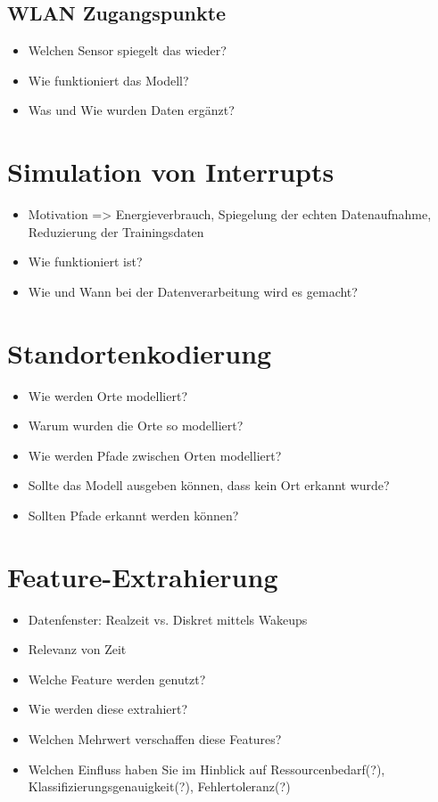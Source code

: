 \subsection{WLAN Zugangspunkte}
\begin{itemize}
    \item Welchen Sensor spiegelt das wieder?
    \item Wie funktioniert das Modell?
    \item Was und Wie wurden Daten ergänzt?
\end{itemize}

\section{Simulation von Interrupts}
\begin{itemize}
    \item Motivation => Energieverbrauch, Spiegelung der echten Datenaufnahme, Reduzierung der Trainingsdaten
    \item Wie funktioniert ist?
    \item Wie und Wann bei der Datenverarbeitung wird es gemacht?
\end{itemize}

\section{Standortenkodierung}
\begin{itemize}
    \item Wie werden Orte modelliert?
    \item Warum wurden die Orte so modelliert?
    \item Wie werden Pfade zwischen Orten modelliert?
    \item Sollte das Modell ausgeben können, dass kein Ort erkannt wurde?
    \item Sollten Pfade erkannt werden können?
\end{itemize}

\section{Feature-Extrahierung}
\begin{itemize}
    \item Datenfenster: Realzeit vs. Diskret mittels Wakeups
    \item Relevanz von Zeit
    \item Welche Feature werden genutzt?
    \item Wie werden diese extrahiert?
    \item Welchen Mehrwert verschaffen diese Features?
    \item Welchen Einfluss haben Sie im Hinblick auf Ressourcenbedarf(?), Klassifizierungsgenauigkeit(?), Fehlertoleranz(?)
\end{itemize}

